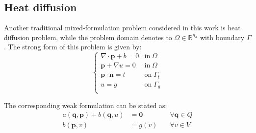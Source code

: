 \subsection{Heat diffusion}
Another traditional mixed-formulation problem considered in this work is heat diffusion problem, while the problem domain denotes to $\Omega \in \mathbb R^{n_d}$ with boundary $\Gamma$. The strong form of this problem is given by:
\begin{equation}\label{strong_heat}
\begin{cases}
    \nabla \cdot \boldsymbol p + b = 0 & \mathrm{in} \; \Omega \\
    \boldsymbol p + \nabla u = 0 & \mathrm{in} \; \Omega \\
    \boldsymbol p \cdot \boldsymbol n = t & \mathrm{on} \; \Gamma_t \\
    u = g & \mathrm{on} \; \Gamma_g \\
\end{cases}
\end{equation}

The corresponding weak formulation can be stated as:
\begin{equation}
\begin{aligned}
    a(\boldsymbol q, \boldsymbol p) + b(\boldsymbol q, u) &= \boldsymbol 0 \quad &\forall \boldsymbol q \in Q \\
    b(\boldsymbol p, v) &= g(v) \quad &\forall v \in V
\end{aligned}
\end{equation}
